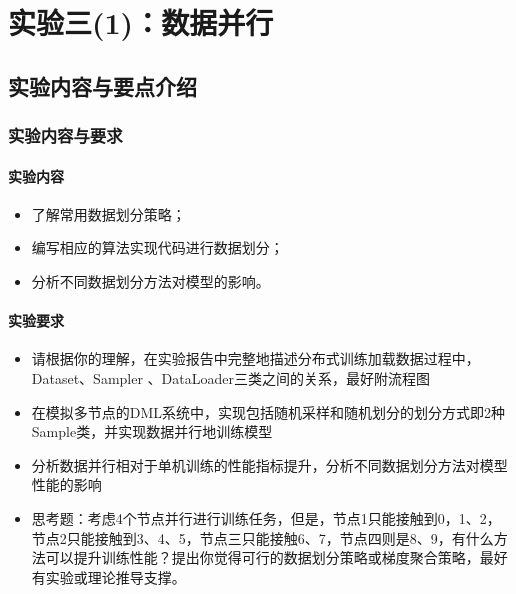 \chapter{实验三(1)：数据并行}

\section{实验内容与要点介绍}

\subsection{实验内容与要求}

\subsubsection{实验内容}
\begin{itemize}
    \item 了解常用数据划分策略；
    \item 编写相应的算法实现代码进行数据划分；
    \item 分析不同数据划分方法对模型的影响。
\end{itemize}


\subsubsection{实验要求}
\begin{itemize}
    \item 请根据你的理解，在实验报告中完整地描述分布式训练加载数据过程中，Dataset、Sampler 、DataLoader三类之间的关系，最好附流程图
    \item 在模拟多节点的DML系统中，实现包括随机采样和随机划分的划分方式即2种Sample类，并实现数据并行地训练模型
    \item 分析数据并行相对于单机训练的性能指标提升，分析不同数据划分方法对模型性能的影响
    \item 思考题：考虑4个节点并行进行训练任务，但是，节点1只能接触到0，1、2，节点2只能接触到3、4、5，节点三只能接触6、7，节点四则是8、9，有什么方法可以提升训练性能？提出你觉得可行的数据划分策略或梯度聚合策略，最好有实验或理论推导支撑。
\end{itemize}


